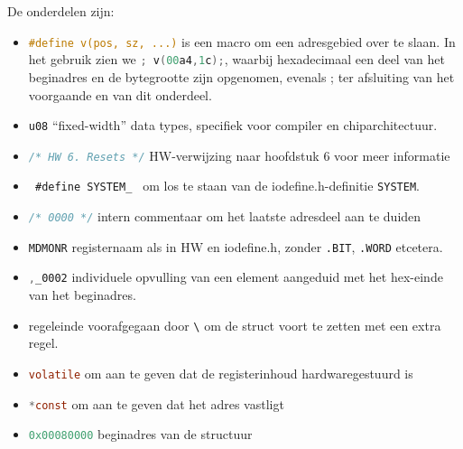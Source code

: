 \documentclass[a4paper, 11pt, fleqn, twoside]{scrartcl}%
\begin{document}
De onderdelen zijn:
\begin{itemize}
\item \lstinline[language=C]!#define v(pos, sz, ...)!
 is een macro om een adresgebied over te slaan.
 In het gebruik zien we \lstinline[language=C]|; v(00a4,1c);|,
 waarbij hexadecimaal een deel van het beginadres en de bytegrootte zijn
 opgenomen, evenals ; ter afsluiting van het voorgaande en van dit onderdeel.
\item \lstinline[language=C]$u08$
 ``fixed-width'' data types, specifiek voor compiler en chiparchitectuur.
\item \lstinline[language=C]!/* HW 6. Resets */!
 HW-verwijzing naar hoofdstuk 6 voor meer informatie
\item \lstinline[language=C]! #define SYSTEM_ !
 om los te staan van de iodefine.h-definitie {\footnotesize\verb|SYSTEM|}.
\item \lstinline[language=C]!/* 0000 */!
 intern commentaar om het laatste adresdeel aan te duiden
\item \lstinline[language=C]|MDMONR|
  registernaam als in HW en iodefine.h, zonder
  {\footnotesize\verb|.BIT|, \verb|.WORD|} etcetera.
\item \lstinline[language=C]|,_0002| individuele opvulling van een element
 aangeduid met het hex-einde van het beginadres.
\item regeleinde voorafgegaan door \lstinline[language=C]|\| om de struct
  voort te zetten met een extra regel.
\item \lstinline[language=C]|volatile|
 om aan te geven dat de registerinhoud hardwaregestuurd is
\item \lstinline[language=C]|*const| om aan te geven dat het adres vastligt
\item \lstinline[language=C]|0x00080000| beginadres van de structuur
\end{itemize}
\end{document}
